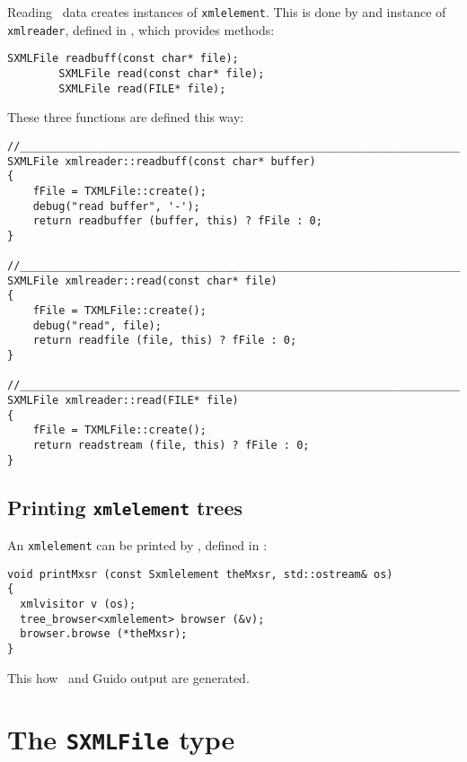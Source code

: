 Reading \mxml\ data creates instances of {\tt xmlelement}. This is done by and instance of {\tt xmlreader}, defined in , which provides methods:
\begin{lstlisting}[language=CPlusPlus]
		SXMLFile readbuff(const char* file);
		SXMLFile read(const char* file);
		SXMLFile read(FILE* file);
\end{lstlisting}

These three functions are defined this way:
\begin{lstlisting}[language=CPlusPlus]
//_______________________________________________________________________________
SXMLFile xmlreader::readbuff(const char* buffer)
{
	fFile = TXMLFile::create();
	debug("read buffer", '-');
	return readbuffer (buffer, this) ? fFile : 0;
}

//_______________________________________________________________________________
SXMLFile xmlreader::read(const char* file)
{
	fFile = TXMLFile::create();
	debug("read", file);
	return readfile (file, this) ? fFile : 0;
}

//_______________________________________________________________________________
SXMLFile xmlreader::read(FILE* file)
{
	fFile = TXMLFile::create();
	return readstream (file, this) ? fFile : 0;
}
\end{lstlisting}


	\subsection{Printing {\tt xmlelement} trees}

An {\tt xmlelement} can be printed by , defined in :
\begin{lstlisting}[language=CPlusPlus]
void printMxsr (const Sxmlelement theMxsr, std::ostream& os)
{
  xmlvisitor v (os);
  tree_browser<xmlelement> browser (&v);
  browser.browse (*theMxsr);
}
\end{lstlisting}

 This how \mxml\ and Guido output are generated.


\section{The {\tt SXMLFile} type}

